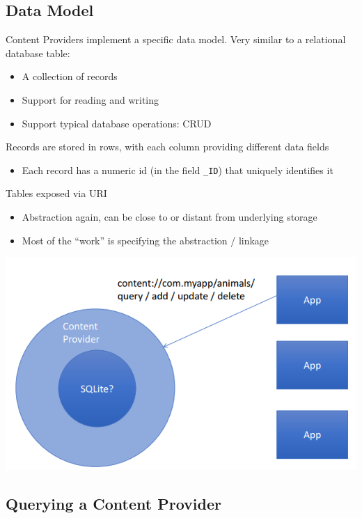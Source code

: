 \documentclass{article}
\begin{document}
\subsection{Data Model}

\begin{flushleft}
Content Providers implement a specific data model. Very similar to a relational database table:
\begin{itemize}
  \item A collection of records 
  \item Support for reading and writing 
  \item Support typical database operations: CRUD
\end{itemize}
Records are stored in rows, with each column providing different data fields
\begin{itemize}
  \item Each record has a numeric id (in the field \verb!_ID!) that uniquely identifies it
\end{itemize}
Tables exposed via URI
\begin{itemize}
  \item Abstraction again, can be close to or distant from underlying storage 
  \item Most of the “work” is specifying the abstraction / linkage
\end{itemize}
\end{flushleft}

\includegraphics[scale=0.5]{data_model.png}

\subsection{Querying a Content Provider}
\end{document}
